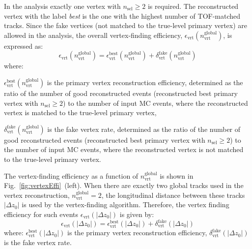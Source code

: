 In the analysis exactly one vertex with $n_\textrm{sel}\geq 2$ is required.  The reconstructed vertex with the label \textit{best} is the one with the highest number of TOF-matched tracks. Since the fake vertices (not matched to the true-level primary vertex) are allowed in the analysis, the overall vertex-finding efficiency, $\epsilon_\textrm{vrt}\left(n_\textrm{vrt}^\textrm{global}\right)$, is expressed as:
\begin{equation}
\epsilon_\textrm{vrt}\left(n_\textrm{vrt}^\textrm{global}\right)=\epsilon_\textrm{vrt}^\textrm{best}\left(n_\textrm{vrt}^\textrm{global}\right)+\delta_\textrm{vrt}^\textrm{fake}\left(n_\textrm{vrt}^\textrm{global}\right)
\end{equation}
where:
\begin{description}
	\item $\epsilon_\textrm{vrt}^\textrm{best}\left(n_\textrm{vrt}^\textrm{global}\right)$ is the primary vertex reconstruction efficiency, determined as the ratio of the number of good reconstructed events (reconstructed best primary vertex with $n_\textrm{sel}\geq 2$) to the number of input MC events, where the reconstructed vertex is matched to the true-level primary vertex,
	\item $\delta_\textrm{vrt}^\textrm{fake}\left(n_\textrm{vrt}^\textrm{global}\right)$ is the fake vertex rate, determined as the ratio of the number of good reconstructed events (reconstructed best primary vertex with $n_\textrm{sel}\geq 2$) to the number of input MC events, where the reconstructed vertex is not matched to the true-level primary vertex.
\end{description}

The vertex-finding efficiency as a function of $n^\textrm{global}_\textrm{vrt}$ is shown in  Fig.~\ref{fig:vertexEffi}~(left). When there are exactly two global tracks used in the vertex reconstruction, $n^\textrm{global}_\textrm{vrt}=2$, the longitudinal distance between these tracks $|\Delta z_0|$  is used by the vertex-finding algorithm. Therefore, the vertex finding efficiency for such events $\epsilon_\textrm{vrt}\left(|\Delta z_0|\right)$ is given by:
\begin{equation}
\epsilon_\textrm{vrt}\left(|\Delta z_0|\right)=\epsilon_\textrm{vrt}^\textrm{best}\left(|\Delta z_0|\right)+\delta_\textrm{vrt}^\textrm{fake}\left(|\Delta z_0|\right)
\end{equation}
where: $\epsilon_\textrm{vrt}^\textrm{best}\left(|\Delta z_0|\right)$ is the primary vertex reconstruction efficiency, $\delta_\textrm{vrt}^\textrm{fake}\left(|\Delta z_0|\right)$ is the fake vertex rate.

